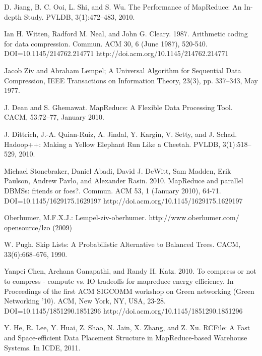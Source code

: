 \documentclass[twocolumn]{article}
\begin{document}
{\begin{thebibliography}{10}
 D. Jiang, B. C. Ooi, L. Shi, and S. Wu. The Performance of
                MapReduce: An In-depth Study. PVLDB, 3(1):472–483,
                2010.

 Ian H. Witten, Radford M. Neal, and John G. Cleary. 1987.
                Arithmetic coding for data compression. Commun.
                ACM 30, 6 (June 1987), 520-540. DOI=10.1145/214762.214771
                http://doi.acm.org/10.1145/214762.214771

 Jacob Ziv and Abraham Lempel; A Universal Algorithm for Sequential
        	Data Compression, IEEE Transactions on Information Theory,
        	23(3), pp. 337–343, May 1977.

 J. Dean and S. Ghemawat. MapReduce: A Flexible Data
                Processing Tool. CACM, 53:72–77, January 2010.

 J. Dittrich, J.-A. Quian-Ruiz, A. Jindal, Y. Kargin,
                V. Setty, and J. Schad. Hadoop++: Making a Yellow
                Elephant Run Like a Cheetah. PVLDB, 3(1):518–529, 2010.\

 Michael Stonebraker, Daniel Abadi, David J. DeWitt, Sam Madden,
                Erik Paulson, Andrew Pavlo, and Alexander Rasin. 2010.
                MapReduce and parallel DBMSs: friends or foes?. Commun.
                ACM 53, 1 (January 2010), 64-71. DOI=10.1145/1629175.1629197
                http://doi.acm.org/10.1145/1629175.1629197

 Oberhumer, M.F.X.J.: Lempel-ziv-oberhumer. http://www.oberhumer.com/
		opensource/lzo (2009)

 W. Pugh. Skip Lists: A Probabilistic Alternative to
        	Balanced Trees. CACM, 33(6):668–676, 1990.

 Yanpei Chen, Archana Ganapathi, and Randy H. Katz. 2010. To compress
                or not to compress - compute vs. IO tradeoffs for mapreduce
                energy efficiency. In Proceedings of the first ACM SIGCOMM
                workshop on Green networking (Green Networking '10). ACM,
                New York, NY, USA, 23-28. DOI=10.1145/1851290.1851296
                http://doi.acm.org/10.1145/1851290.1851296

 Y. He, R. Lee, Y. Huai, Z. Shao, N. Jain, X. Zhang, and
        	Z. Xu. RCFile: A Fast and Space-efficient Data Placement
        	Structure in MapReduce-based Warehouse Systems. In ICDE, 2011.

\end{thebibliography}
}
\end{document}
